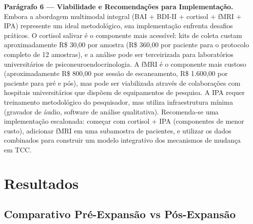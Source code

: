 \documentclass[12pt,a4paper]{article}
\begin{document}
\textbf{Parágrafo 6 — Viabilidade e Recomendações para Implementação.} Embora a abordagem multimodal integral (BAI + BDI-II + cortisol + fMRI + IPA) represente um ideal metodológico, sua implementação enfrenta desafios práticos. O cortisol salivar é o componente mais acessível: kits de coleta custam aproximadamente R\$ 30,00 por amostra (R\$ 360,00 por paciente para o protocolo completo de 12 amostras), e a análise pode ser terceirizada para laboratórios universitários de psiconeuroendocrinologia. A fMRI é o componente mais custoso (aproximadamente R\$ 800,00 por sessão de escaneamento, R\$ 1.600,00 por paciente para pré e pós), mas pode ser viabilizada através de colaborações com hospitais universitários que dispõem de equipamentos de pesquisa. A IPA requer treinamento metodológico do pesquisador, mas utiliza infraestrutura mínima (gravador de áudio, software de análise qualitativa). Recomenda-se uma implementação escalonada: começar com cortisol + IPA (componentes de menor custo), adicionar fMRI em uma subamostra de pacientes, e utilizar os dados combinados para construir um modelo integrativo dos mecanismos de mudança em TCC.

\section{Resultados}

\subsection{Comparativo Pré-Expansão vs Pós-Expansão}
\end{document}
